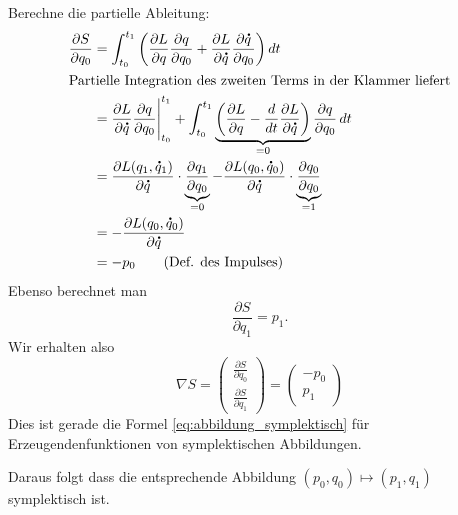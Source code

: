 Berechne die partielle Ableitung:
\begin{align*}
\frac{\partial S}{\partial q_0}
& =
\int_{t_0}^{t_1} \bigg( \frac{\partial L}{\partial q} \frac{\partial q}{\partial q_0} + \frac{\partial L}{\partial \dot q}\frac{\partial\dot q}{\partial q_0}\bigg)\,dt \\
%
\intertext{Partielle Integration des zweiten Terms in der Klammer liefert}
&=
\frac{\partial L}{\partial \dot q}\frac{\partial q}{\partial q_0}\Bigg\vert_{t_0}^{t_1} + \int_{t_0}^{t_1} \underbrace{\bigg( \frac{\partial L}{\partial q}  - \frac{d}{dt} \frac{\partial L}{\partial \dot q}\bigg)}_{=0} \frac{\partial q}{\partial q_0}\,dt \\
&= \frac{\partial L(q_1,\dot q_1)}{\partial \dot q} \cdot \underbrace{\frac{\partial q_1}{\partial q_0}}_{=0}  - \frac{\partial L(q_0,\dot q_0)}{\partial \dot q} \cdot \underbrace{\frac{\partial q_0}{\partial q_0}}_{=1}  \\
&= - \frac{\partial L(q_0,\dot q_0)}{\partial \dot q} \\
&= -p_0 \tag{Def. des Impulses}
\end{align*}
Ebenso berechnet man
\begin{equation*}
\frac{\partial S}{\partial q_1} = p_1.
\end{equation*}
Wir erhalten also
\begin{equation}
\nabla S =
\begin{pmatrix}
\frac{\partial S}{\partial q_0}  \\
\frac{\partial S}{\partial q_1}
\end{pmatrix}
=
\begin{pmatrix}
-p_0 \\ p_1
\end{pmatrix}
\end{equation}
Dies ist gerade die Formel \eqref{eq:abbildung_symplektisch} für Erzeugendenfunktionen von symplektischen Abbildungen.

Daraus folgt dass die entsprechende Abbildung $(p_0,q_0) \mapsto (p_1,q_1)$ symplektisch ist.





